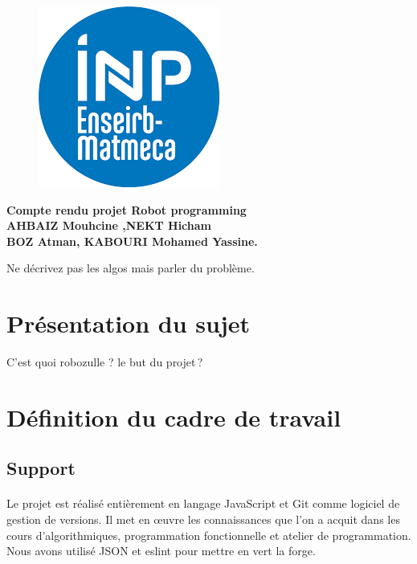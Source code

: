 \documentclass{article}
\begin{document}
\begin{titlepage}

\begin{figure}[h!]
\centering
\includegraphics[scale=1]{download.png}
\end{figure}

\begin{center}
    \fontsize{32}{32}\selectfont\textbf{Compte rendu projet Robot programming}\\[3cm] 
    {\fontsize{15}{15}\selectfont \textbf{AHBAIZ Mouhcine ,NEKT Hicham\\ BOZ Atman, KABOURI Mohamed Yassine.}}     \\   [6cm]
\end{center} 

\end{titlepage}

\newpage
\tableofcontents
\newpage


Ne décrivez pas les algos mais parler du problème.

\section{Présentation du sujet}

C'est quoi robozulle ? le but du projet ?


\section{Définition du cadre de travail}
\subsection{Support}

\paragraph{}Le projet est réalisé entièrement en langage JavaScript et Git comme logiciel de gestion de versions. 
Il met en œuvre les connaissances que l’on a acquit dans les cours d’algorithmiques, programmation fonctionnelle et 
atelier de programmation. Nous avons utilisé JSON et eslint pour mettre en vert la forge. 
\end{document}
